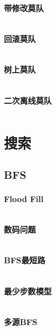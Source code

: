 \documentclass[a4paper,12pt]{article}
\begin{document}
\subsubsection{带修改莫队}
\inputminted[breaklines, linenos]{c++}{ds/modify_mo.cc}
\subsubsection{回滚莫队}
\inputminted[breaklines, linenos]{c++}{ds/rollback_mo.cc}
\subsubsection{树上莫队}
\inputminted[breaklines, linenos]{c++}{ds/tree_mo.cc}
\subsubsection{二次离线莫队}
\inputminted[breaklines, linenos]{c++}{ds/offline_mo.cc}


\newpage  
\section{搜索}
\subsection{BFS}
\subsubsection{Flood Fill}
\inputminted[breaklines, linenos]{c++}{search/bfs/flood.cc}
\subsubsection{数码问题}
\inputminted[breaklines, linenos]{c++}{search/bfs/shuma.cc}
\subsubsection{BFS最短路}
\inputminted[breaklines, linenos]{c++}{search/bfs/path.cc}
\subsubsection{最少步数模型}
\inputminted[breaklines, linenos]{c++}{search/bfs/min_step.cc}
\subsubsection{多源BFS}
\inputminted[breaklines, linenos]{c++}{search/bfs/mul_source.cc}
\end{document}

